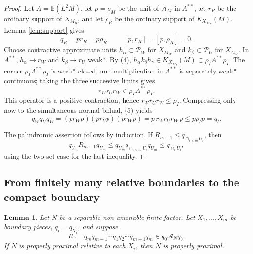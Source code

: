 \documentclass[12pt]{article}
\newtheorem{lemma}{Lemma}
\newcommand{\cA}{\mathcal A}
\begin{document}
\begin{proof}
Let \(A=\mathbb B(L^2M)\), let \(p=p_M\) be the unit of \(\cA_M\) in
\(A^{**}\), let \(r_R\) be the ordinary support of \(X_{M_R}\), and let
\(\rho_R\) be the ordinary support of \(K_{X_{M_R}}(M)\).  Lemma
\ref{lem:support} gives
\[
        q_R=pr_R=p\rho_R,\qquad [p,r_R]=[p,\rho_R]=0 .              \tag{5}
\]
Choose contractive approximate units
\(h_\alpha\subset\mathcal P_W\) for \(X_{M_W}\) and
\(k_\beta\subset\mathcal P_U\) for \(X_{M_U}\).  In \(A^{**}\),
\(h_\alpha\to r_W\) and \(k_\beta\to r_U\) weak*.  By (4),
\(h_\alpha k_\beta h_\gamma\in K_{X_{M_I}}(M)\subset
\rho_IA^{**}\rho_I\).  The corner \(\rho_IA^{**}\rho_I\) is weak* closed, and
multiplication in \(A^{**}\) is separately weak* continuous; taking the three
successive limits gives
\[
        r_W r_U r_W\in \rho_I A^{**}\rho_I .
\]
This operator is a positive contraction, hence \(r_Wr_Ur_W\le \rho_I\).
Compressing only now to the simultaneous normal bidual, (5) yields
\[
 q_Wq_Uq_W
 =(pr_Wp)(pr_Up)(pr_Wp)
 =p\,r_Wr_Ur_W\,p
 \le p\rho_Ip=q_I .
\]

The palindromic assertion follows by induction.  If
\(R_{m-1}\le q_{\cap_{i<m}U_i}\), then
\[
q_{U_m}R_{m-1}q_{U_m}
 \le q_{U_m}q_{\cap_{i<m}U_i}q_{U_m}
 \le q_{\cap_iU_i},
\]
using the two-set case for the last inequality.
\end{proof}

\subsection*{From finitely many relative boundaries to the compact boundary}

\begin{lemma}\label{lem:finite}
Let \(N\) be a separable non-amenable finite factor.  Let
\(X_1,\ldots,X_m\) be boundary pieces, \(q_i=q_{X_i}\), and suppose
\[
        R:=q_mq_{m-1}\cdots q_1q_2\cdots q_{m-1}q_m\in q_0\cA_Nq_0. \tag{6}
\]
If \(N\) is properly proximal relative to each \(X_i\), then \(N\) is properly
proximal.
\end{lemma}
\end{document}
